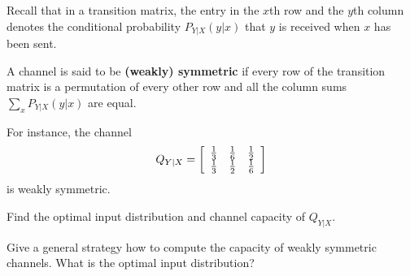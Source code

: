 \documentclass[a4paper,10pt,landscape,twocolumn]{scrartcl}
\begin{document}
\begin{exercise}
Recall that in a transition matrix, the entry in the $x$th row and the $y$th column denotes the conditional probability $P_{Y|X}(y|x)$ that $y$ is received when $x$ has been sent.


A channel is said to be \textbf{(weakly) symmetric} if every row of the transition matrix is a permutation of every other row and all the column sums $\sum_x P_{Y|X}(y|x)$ are equal.

For instance, %
the channel
\[
Q_{Y|X} = \left[
\begin{array}{c c c}
\frac{1}{3}&\frac{1}{6}&\frac{1}{2}\\
\frac{1}{3}&\frac{1}{2}&\frac{1}{6}
\end{array}
\right]
\]
is weakly symmetric.
	\begin{subex}
	Find the optimal input distribution and channel capacity of $Q_{Y|X}$.
	\end{subex}
	\begin{subex}
	Give a general strategy how to compute the capacity of weakly symmetric channels. What is the optimal input distribution?
	\end{subex}
\end{exercise}
\end{document}
